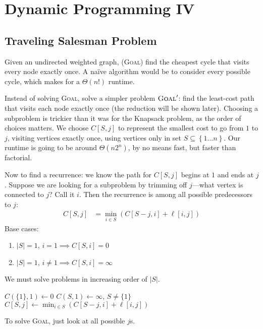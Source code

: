 \chapter{Dynamic Programming IV}
\section{Traveling Salesman Problem}
Given an undirected weighted graph, (\textsc{Goal}) find the cheapest cycle that visits every node exactly once.
A na\"ive algorithm would be to consider every possible cycle, which makes for a \(\Theta(n!)\) runtime.

Instead of solving \textsc{Goal}, solve a simpler problem \(\textsc{Goal}'\): find the least-cost path that visits each node exactly once
(the reduction will be shown later).
Choosing a subproblem is trickier than it was for the Knapsack problem,
as the order of choices matters. We choose \(C[S,j]\) to represent the smallest cost to
go from \(1\) to \(j\), visiting vertices exactly once, using vertices only in set \(S\subseteq\left\{1\ldots n\right\}\).
Our runtime is going to be around \(\Theta(n2^n)\), by no means fast, but faster than factorial.

Now to find a recurrence: we know the path for \(C[S,j]\) begins at \(1\) and ends at \(j\).
Suppose we are looking for a subproblem by trimming off \(j\)---what vertex is connected to \(j\)?
Call it \(i\). Then the recurrence is among all possible predecessors to \(j\):
\begin{align}
C[S,j] &= \min_{i\in S} \left(C[S - j, i] + \ell[i,j]\right)
\end{align}
Base cases:
\begin{enumerate}
		\item \(\left|S\right| = 1\), \(i = 1 \implies C[S, i] = 0\)
		\item \(\left|S\right| = 1\), \(i \neq 1 \implies C[S, i] = \infty\)
\end{enumerate}

We must solve problems in increasing order of \(\left|S\right|\).
\begin{algorithmic}[1]
	\State \(C(\{1\}, 1) \gets 0\)
	\State \(C(S, 1) \gets \infty\), \(S \neq \{1\}\)
				\State \(C[S,j] \gets \min_{i\in S} \left(C[S - j, i] + \ell[i,j]\right)\)
			\EndFor
		\EndFor
	\EndFor
\end{algorithmic}
To solve \textsc{Goal}, just look at all possible \(j\)s.

